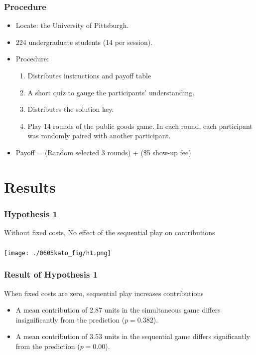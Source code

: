 \documentclass[unicode,12pt]{beamer}
\begin{document}
    \begin{frame}
        \frametitle{Procedure}
    
        \begin{itemize}
            \item Locate: the University of Pittsburgh.
            \item 224 undergraduate students (14 per session).
            \item Procedure:
            \begin{enumerate}
                \item Distributes instructions and payoff table
                \item A short quiz to gauge the participants' understanding.
                \item Distributes the solution key.
                \item Play 14 rounds of the public goods game. In each round, each participant was randomly paired with another participant.
            \end{enumerate}
            \item Payoff = (Random selected 3 rounds) + (\$5 show-up fee)
        \end{itemize}
    
    \end{frame}

    \section{Results}

    \begin{frame}
        \frametitle{Hypothesis 1}
    
        Without fixed costs, No effect of the sequential play on contributions
    
    \end{frame}

    \begin{frame}
        \frametitle{}
    
        \centerline{\texttt{[image: ./0605kato\_fig/h1.png]}}
    
    \end{frame}

    \begin{frame}
        \frametitle{Result of Hypothesis 1}
    
        When fixed costs are zero, sequential play increases contributions
        \begin{itemize}
            \item A mean contribution of 2.87 units in the simultaneous game differs insignificantly from the prediction ($p = 0.382$).
            \item A mean contribution of 3.53 units in the sequential game differs significantly from the prediction ($p = 0.00$).
        \end{itemize}
    
    \end{frame}
\end{document}

